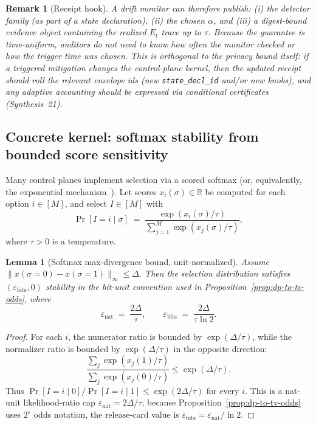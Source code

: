 \documentclass[11pt]{article}
\newtheorem{lemma}{Lemma}
\newtheorem{remark}{Remark}
\begin{document}
\begin{remark}[Receipt hook]
A drift monitor can therefore publish: (i) the detector family (as part of a state declaration), (ii) the chosen $\alpha$, and (iii) a digest-bound evidence object containing the realized $E_t$ trace up to $\tau$.
Because the guarantee is time-uniform, auditors do not need to know how often the monitor checked or how the trigger time was chosen.
This is orthogonal to the privacy bound itself: if a triggered mitigation changes the control-plane kernel, then the updated receipt should roll the relevant envelope ids (new \texttt{state\_decl\_id} and/or new knobs), and any adaptive accounting should be expressed via conditional certificates (Synthesis~21).\cite{series:condcert,series:planstateequiv}
\end{remark}


\subsection{Concrete kernel: softmax stability from bounded score sensitivity}
Many control planes implement selection via a scored softmax (or, equivalently, the exponential mechanism~\cite{mcsherry2007mechanism}).
Let scores $x_i(\sigma)\in\mathbb{R}$ be computed for each option $i\in[M]$, and select $I\in[M]$ with
\[
\Pr[I=i\mid \sigma] \;=\; \frac{\exp(x_i(\sigma)/\tau)}{\sum_{j=1}^M \exp(x_j(\sigma)/\tau)},
\]
where $\tau>0$ is a temperature.

\begin{lemma}[Softmax max-divergence bound, unit-normalized]
\label{lem:softmax-stability}
Assume $\|x(\sigma{=}0)-x(\sigma{=}1)\|_\infty \le \Delta$.
Then the selection distribution satisfies $(\varepsilon_{\mathrm{bits}},0)$ stability in the bit-unit convention used in Proposition~\ref{prop:dp-to-tv-odds}, where
\[
\varepsilon_{\mathrm{nat}} \;=\; \frac{2\Delta}{\tau},
\qquad
\varepsilon_{\mathrm{bits}} \;=\; \frac{2\Delta}{\tau\ln 2}.
\]
\end{lemma}

\begin{proof}
For each $i$, the numerator ratio is bounded by $\exp(\Delta/\tau)$, while the normalizer ratio is bounded by $\exp(\Delta/\tau)$ in the opposite direction:
\[
\frac{\sum_j \exp(x_j(1)/\tau)}{\sum_j \exp(x_j(0)/\tau)} \le \exp(\Delta/\tau).
\]
Thus $\Pr[I=i\mid 0]/\Pr[I=i\mid 1]\le \exp(2\Delta/\tau)$ for every $i$. This is a nat-unit likelihood-ratio cap $\varepsilon_{\mathrm{nat}}=2\Delta/\tau$; because Proposition~\ref{prop:dp-to-tv-odds} uses $2^{\varepsilon}$ odds notation, the release-card value is $\varepsilon_{\mathrm{bits}}=\varepsilon_{\mathrm{nat}}/\ln 2$.
\end{proof}
\end{document}
